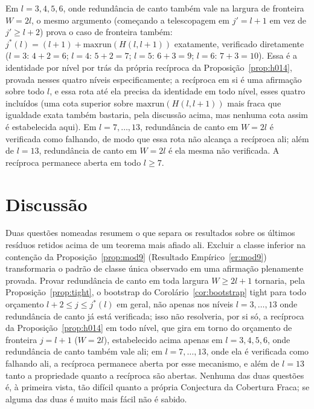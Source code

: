 \documentclass[11pt]{amsart}
\theoremstyle{plain}
\theoremstyle{definition}
\theoremstyle{remark}
\begin{document}
Em $l=3,4,5,6$, onde redundância de canto também vale na largura de fronteira $W=2l$, o mesmo
argumento (começando a telescopagem em $j'=l+1$ em vez de $j'\ge l+2$) prova o caso de fronteira
também: $j^*(l)=(l+1)+\mathrm{maxrun}(H(l,l+1))$ exatamente, verificado diretamente ($l=3$:
$4+2=6$; $l=4$: $5+2=7$; $l=5$: $6+3=9$; $l=6$: $7+3=10$). Essa é a identidade por nível por trás
da própria recíproca da Proposição~\ref{prop:h014}, provada nesses quatro níveis especificamente; a
recíproca em si é uma afirmação sobre todo $l$, e essa rota até ela precisa da identidade em todo
nível, esses quatro incluídos (uma cota superior sobre $\mathrm{maxrun}(H(l,l+1))$ mais fraca que
igualdade exata também bastaria, pela discussão acima, mas nenhuma cota assim é estabelecida
aqui). Em $l=7,\dots,13$, redundância de canto em $W=2l$ é verificada como falhando, de modo que
essa rota não alcança a recíproca ali; além de $l=13$, redundância de canto em $W=2l$ é ela mesma
não verificada. A recíproca permanece aberta em todo $l\ge7$.

\section{Discussão}
\label{sec:discussion}

Duas questões nomeadas resumem o que separa os resultados sobre os últimos resíduos retidos acima
de um teorema mais afiado ali. Excluir a classe inferior na contenção da
Proposição~\ref{prop:mod9} (Resultado Empírico~\ref{er:mod9}) transformaria o padrão de classe
única observado em uma afirmação plenamente provada. Provar redundância de canto em toda largura
$W\ge2l+1$ tornaria, pela Proposição~\ref{prop:tight}, o bootstrap do Corolário~\ref{cor:bootstrap}
tight para todo orçamento $l+2\le j\le j^*(l)$ em geral, não apenas nos níveis $l=3,\dots,13$ onde
redundância de canto já está verificada; isso não resolveria, por si só, a recíproca da
Proposição~\ref{prop:h014} em todo nível, que gira em torno do orçamento de fronteira $j=l+1$
($W=2l$), estabelecido acima apenas em $l=3,4,5,6$, onde redundância de canto também vale ali; em
$l=7,\dots,13$, onde ela é verificada como falhando ali, a recíproca permanece aberta por esse
mecanismo, e além de $l=13$ tanto a propriedade quanto a recíproca são abertas. Nenhuma das duas
questões é, à primeira vista, tão difícil quanto a própria Conjectura da Cobertura Fraca; se
alguma das duas é muito mais fácil não é sabido.
\end{document}
